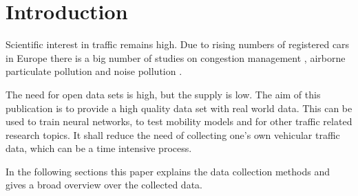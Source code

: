 \section{Introduction}
\label{sec:Background}
Scientific interest in traffic remains high. Due to rising numbers of registered cars in Europe \cite{acea_report} there is a big number of studies on congestion management \cite{5940493}\cite{8070077}, airborne particulate pollution\cite{HE2021115931} and noise pollution \cite{MEHDI201197}. %

The need for open data sets is high, but the supply is low. The aim of this publication is to provide a high quality data set with real world data. This can be used to train neural networks, to test mobility models and for other traffic related research topics. It shall reduce the need of collecting one's own vehicular traffic data, which can be a time intensive process.

In the following sections this paper explains the data collection methods and gives a broad overview over the collected data.